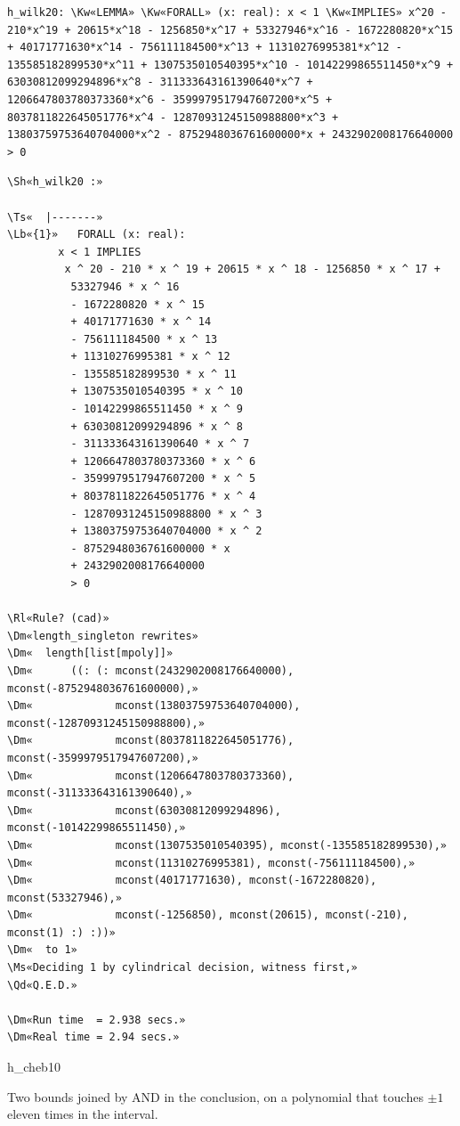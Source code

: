 \documentclass[11pt]{article}
\newcommand\Rl[1]{\textcolor{accent}{\textbf{#1}}}
\newcommand\Ms[1]{\textcolor{moss}{\textbf{#1}}}
\newcommand\Qd[1]{\colorbox{mosssoft}{\textcolor{moss}{\textbf{#1}}}}
\newcommand\Dm[1]{\textcolor{muted}{#1}}
\newcommand\Lb[1]{\textcolor{muted}{#1}}
\newcommand\Ts[1]{\textcolor{muted}{#1}}
\newcommand\Sh[1]{\textcolor{accent}{#1}}
\newcommand\Kw[1]{\textcolor{accent}{\textbf{#1}}}
\newcommand\example[4]{%
  \par\addvspace{14pt}\needspace{8\baselineskip}%
  \noindent{\sffamily\large\bfseries #1}\hfill{\ttfamily\small\color{muted}#2}\par\nopagebreak[4]\vspace{2pt}%
  \noindent{\sffamily\small\color{muted}#3 \quad·\quad #4}\par\nopagebreak[4]\vspace{4pt}\noindent\ignorespaces}
\begin{document}
\begin{Verbatim}[commandchars=\\«», fontsize=\small]
  h_wilk20: \Kw«LEMMA» \Kw«FORALL» (x: real): x < 1 \Kw«IMPLIES» x^20 - 210*x^19 + 20615*x^18 - 1256850*x^17 + 53327946*x^16 - 1672280820*x^15 + 40171771630*x^14 - 756111184500*x^13 + 11310276995381*x^12 - 135585182899530*x^11 + 1307535010540395*x^10 - 10142299865511450*x^9 + 63030812099294896*x^8 - 311333643161390640*x^7 + 1206647803780373360*x^6 - 3599979517947607200*x^5 + 8037811822645051776*x^4 - 12870931245150988800*x^3 + 13803759753640704000*x^2 - 8752948036761600000*x + 2432902008176640000 > 0
\end{Verbatim}
\begin{termbox}
\begin{Verbatim}[commandchars=\\«»]
\Sh«h_wilk20 :»

\Ts«  |-------»
\Lb«{1}»   FORALL (x: real):
        x < 1 IMPLIES
         x ^ 20 - 210 * x ^ 19 + 20615 * x ^ 18 - 1256850 * x ^ 17 +
          53327946 * x ^ 16
          - 1672280820 * x ^ 15
          + 40171771630 * x ^ 14
          - 756111184500 * x ^ 13
          + 11310276995381 * x ^ 12
          - 135585182899530 * x ^ 11
          + 1307535010540395 * x ^ 10
          - 10142299865511450 * x ^ 9
          + 63030812099294896 * x ^ 8
          - 311333643161390640 * x ^ 7
          + 1206647803780373360 * x ^ 6
          - 3599979517947607200 * x ^ 5
          + 8037811822645051776 * x ^ 4
          - 12870931245150988800 * x ^ 3
          + 13803759753640704000 * x ^ 2
          - 8752948036761600000 * x
          + 2432902008176640000
          > 0

\Rl«Rule? (cad)»
\Dm«length_singleton rewrites»
\Dm«  length[list[mpoly]]»
\Dm«      ((: (: mconst(2432902008176640000), mconst(-8752948036761600000),»
\Dm«             mconst(13803759753640704000), mconst(-12870931245150988800),»
\Dm«             mconst(8037811822645051776), mconst(-3599979517947607200),»
\Dm«             mconst(1206647803780373360), mconst(-311333643161390640),»
\Dm«             mconst(63030812099294896), mconst(-10142299865511450),»
\Dm«             mconst(1307535010540395), mconst(-135585182899530),»
\Dm«             mconst(11310276995381), mconst(-756111184500),»
\Dm«             mconst(40171771630), mconst(-1672280820), mconst(53327946),»
\Dm«             mconst(-1256850), mconst(20615), mconst(-210), mconst(1) :) :))»
\Dm«  to 1»
\Ms«Deciding 1 by cylindrical decision, witness first,»
\Qd«Q.E.D.»

\Dm«Run time  = 2.938 secs.»
\Dm«Real time = 2.94 secs.»
\end{Verbatim}
\end{termbox}
\example{Chebyshev $T_{10}$ stays in $[-1,1]$}{h\_cheb10}{$\forall$, degree 10}{2.0\,s}
Two bounds joined by AND in the conclusion, on a polynomial that touches $\pm1$ eleven times in the interval.
\end{document}
